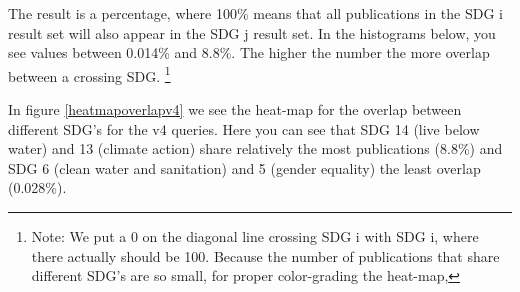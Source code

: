\documentclass{article}
\begin{document}
The result is a percentage, where 100\% means that all publications in the SDG i result set will also appear in the SDG j result set. In the histograms below, you see values between 0.014\% and 8.8\%. The higher the number the more overlap between a crossing SDG. \footnote{
Note: We put a 0 on the diagonal line crossing SDG i with SDG i, where there actually should be 100. Because the number of publications that share different SDG's are so small, for proper color-grading the heat-map, }

In figure \ref{heatmapoverlapv4} we see the heat-map for the overlap between different SDG's for the v4 queries. Here you can see that SDG 14 (live below water) and 13 (climate action) share relatively the most publications (8.8\%) and SDG 6 (clean water and sanitation) and 5 (gender equality) the least overlap (0.028\%).
\end{document}
